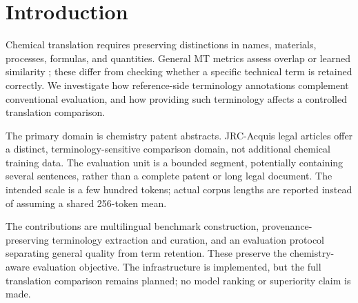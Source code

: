 \section{Introduction}
\label{sec:introduction}

Chemical translation requires preserving distinctions in names, materials, processes, formulas,
and quantities. General MT metrics assess overlap or learned similarity
\cite{papineni2002,post2018,rei2020,zhang2020}; these differ from checking whether a specific technical
term is retained correctly. We investigate how reference-side terminology annotations complement
conventional evaluation, and how providing such terminology affects a controlled translation comparison.

The primary domain is chemistry patent abstracts. JRC-Acquis legal articles offer a distinct,
terminology-sensitive comparison domain, not additional chemical training data. The evaluation unit
is a bounded segment, potentially containing several sentences, rather than a complete patent or
long legal document. The intended scale is a few hundred tokens; actual corpus lengths are reported
instead of assuming a shared 256-token mean.

The contributions are multilingual benchmark construction, provenance-preserving terminology
extraction and curation, and an evaluation protocol separating general quality from term retention.
These preserve the chemistry-aware evaluation objective. The infrastructure is implemented, but
the full translation comparison remains planned; no model ranking or superiority claim is made.